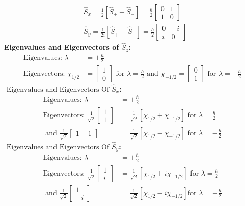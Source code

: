 $$\begin{aligned}
	&\hat{S}_{x}=\frac{1}{2}\left[\hat{S}_{+}+\hat{S}_{-}\right]=\frac{\hbar}{2}\left[\begin{array}{ll}
		0 & 1 \\
		1 & 0
	\end{array}\right] \\
	&\hat{S}_{y}=\frac{1}{2 i}\left[\hat{S}_{+}-\hat{S}_{-}\right]=\frac{\hbar}{2}\left[\begin{array}{ll}
		0 & -i \\
		i & 0
	\end{array}\right]
\end{aligned}$$
\textbf{ Eigenvalues and Eigenvectors of  $\hat{S}_{z}$:}
\begin{align*}
\text{Eigenvalues: }\lambda&=\pm \frac{\hbar}{2}\\
\text{Eigenvectors: }\chi_{1 / 2}&=\left[\begin{array}{l}1 \\ 0\end{array}\right]\text{ for } \lambda=\frac{\hbar}{2}\text{ and }\chi_{-1 / 2}=\left[\begin{array}{c}0 \\ 1\end{array}\right]\text{ for }\lambda=-\frac{\hbar}{2}
\end{align*}
\textbf{$\text { Eigenvalues and Eigenvectors Of } \hat{S}_{x}$:}
\begin{align*}
\text{Eigenvalues: }\lambda&=\pm \frac{\hbar}{2}\\
\text{Eigenvectors: }\frac{1}{\sqrt{2}}\left[\begin{array}{l}1 \\ 1\end{array}\right]&=\frac{1}{\sqrt{2}}\left[\chi_{1 / 2}+\chi_{-1 / 2}\right]\text{ for } \lambda=\frac{\hbar}{2}\\
\text{ and }\frac{1}{\sqrt{2}}\left[\begin{array}{l}1  -1\end{array}\right]&=\frac{1}{\sqrt{2}}\left[\chi_{1 / 2}-\chi_{-1 / 2}\right]\text{ for } \lambda=-\frac{\hbar}{2}
\end{align*}
\textbf{$\text { Eigenvalues and Eigenvectors Of } \hat{S}_{y}$:}
\begin{align*}
\text{Eigenvalues: }\lambda&=\pm \frac{\hbar}{2}\\
\text{Eigenvectors: }\frac{1}{\sqrt{2}}\left[\begin{array}{l}1 \\ i\end{array}\right]&=\frac{1}{\sqrt{2}}\left[\chi_{1 / 2}+i \chi_{-1 / 2}\right] \text{ for }\lambda=\frac{\hbar}{2}\\
\text{ and }\frac{1}{\sqrt{2}}\left[\begin{array}{l}1 \\ -i\end{array}\right]&=\frac{1}{\sqrt{2}}\left[\chi_{1 / 2}-i \chi_{-1 / 2}\right] \text{for }\lambda=-\frac{\hbar}{2}
\end{align*}




